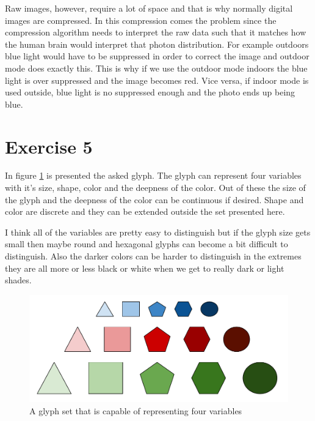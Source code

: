 \documentclass{article}
\begin{document}
Raw images, however, require a lot of space and that is why normally digital images are compressed. In this compression comes the problem since the compression algorithm needs to interpret the raw data such that it matches how the human brain would  interpret that photon distribution. For example outdoors blue light would have to be suppressed in order to correct the image and outdoor mode does exactly this. This is why if we use the outdoor mode indoors the blue light is over suppressed and the image becomes red. Vice versa, if indoor mode is used outside, blue light is no suppressed enough and the photo ends up being blue.

\section*{Exercise 5}  

In figure \ref{glyphs} is presented the asked glyph. The glyph can represent four variables with it's size, shape, color and the deepness of the color. Out of these the size of the glyph and the deepness of the color can be continuous if desired. Shape and color are discrete and they can be extended outside the set presented here. 

I think all of the variables are pretty easy to distinguish but if the glyph size gets small then maybe round and hexagonal glyphs can become a bit difficult to distinguish. Also the darker colors can be harder to distinguish in the extremes they are all more or less black or white when we get to really dark or light shades.
\begin{figure}[h!]
	\centering
	\includegraphics[width = \linewidth]{glyphs}
	\caption{A glyph set that is capable of representing four variables}
	\label{glyphs}
\end{figure}
\end{document}
